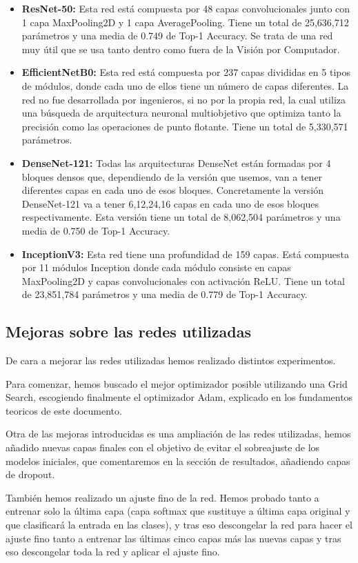 \begin{itemize}


\item{\textbf{ResNet-50:} Esta red está compuesta por 48 capas convolucionales junto con 1 capa MaxPooling2D y 1 capa AveragePooling. Tiene un total de 25,636,712 parámetros y una media de 0.749 de Top-1 Accuracy. Se trata de una red muy útil que se usa tanto dentro como fuera de la Visión por Computador.}


\item{\textbf{EfficientNetB0:} Esta red está compuesta por 237 capas divididas en 5 tipos de módulos, donde cada uno de ellos tiene un número de capas diferentes. La red no fue desarrollada por ingenieros, si no por la propia red, la cual utiliza una búsqueda de arquitectura neuronal multiobjetivo que optimiza tanto la precisión como las operaciones de punto flotante. Tiene un total de 5,330,571 parámetros.}

\item{\textbf{DenseNet-121:} Todas las arquitecturas DenseNet están formadas por 4 bloques densos que, dependiendo de la versión que usemos, van a tener diferentes capas en cada uno de esos bloques. Concretamente la versión DenseNet-121 va a tener 6,12,24,16 capas en cada uno de esos bloques respectivamente. Esta versión tiene un total de 8,062,504 parámetros y una media de 0.750 de Top-1 Accuracy.}


\item{\textbf{InceptionV3:} Esta red tiene una profundidad de 159 capas. Está compuesta por 11 módulos Inception donde cada módulo consiste en capas MaxPooling2D y capas convolucionales con activación ReLU. Tiene un total de 23,851,784 parámetros y una media de 0.779 de Top-1 Accuracy.}


\end{itemize}

\newpage

\subsection{Mejoras sobre las redes utilizadas}

De cara a mejorar las redes utilizadas hemos realizado distintos experimentos.

Para comenzar, hemos buscado el mejor optimizador posible utilizando una Grid Search, escogiendo finalmente el optimizador Adam, explicado en los fundamentos teoricos de este documento.

Otra de las mejoras introducidas es una ampliación de las redes utilizadas, hemos añadido nuevas capas finales con el objetivo de evitar el sobreajuste de los modelos iniciales, que comentaremos en la sección de resultados, añadiendo capas de dropout.

También hemos realizado un ajuste fino de la red. Hemos probado tanto a entrenar solo la última capa (capa softmax que sustituye a última capa original y que clasificará la entrada en las clases), y tras eso descongelar la red para hacer el ajuste fino tanto a entrenar las últimas cinco capas más las nuevas capas y tras eso descongelar toda la red y aplicar el ajuste fino.
